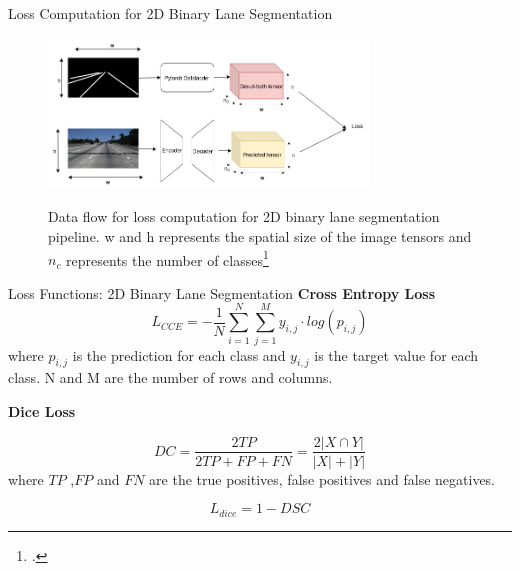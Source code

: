 \documentclass[aspectratio=169]{beamer}
\begin{document}
\begin{frame}{Loss Computation for 2D Binary Lane Segmentation}
    \begin{figure}[H]
     \centering
     
\includegraphics[width=0.6\linewidth, height=4cm]{images/2d_dataflow_loss_computation.jpg} 
\label{fig:subim1}

\caption{ Data flow for loss computation for 2D binary lane segmentation pipeline. w and h represents
the spatial size of the image tensors and $n_{c}$ represents the number of classes\footcite{Tusimple}}
\label{fig:image2}
\end{figure}
\end{frame}
\begin{frame}{Loss Functions: 2D Binary Lane Segmentation}
    \textbf{Cross Entropy Loss}
    \begin{equation}
        L_{CCE} = -\frac{1}{N}\sum_{i=1}^{N} \sum^{M}_{j=1}y_{i,j}\cdot log(p_{i,j})
        \end{equation}
        where $p_{i,j}$ is the prediction for each class and $y_{i,j}$ is the target value for each class. N and M are the number of rows and columns.
    
    \textbf{Dice Loss}

    \begin{equation}
            DC = \frac{2TP}{2TP + FP + FN} = \frac{2|X \cap Y|}{|X| + |Y|}
        \end{equation}
    where $TP$ ,$FP$ and $FN$ are the true positives, false positives and false negatives.  
        
        \begin{equation}
            L_{dice} = 1 - DSC
        \end{equation}
    
\end{frame}
\end{document}
